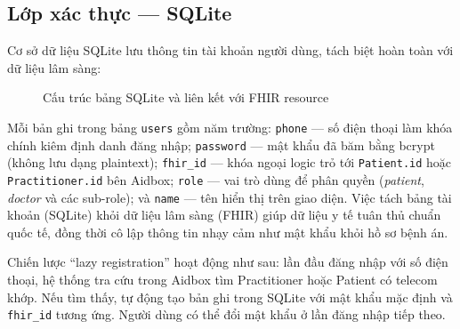 \documentclass[a4paper,13pt,3p,oneside]{report}
\theoremstyle{definition}
\theoremstyle{remark}
\theoremstyle{definition}
\begin{document}
\subsection{Lớp xác thực --- SQLite}

Cơ sở dữ liệu SQLite lưu thông tin tài khoản người dùng, tách biệt hoàn toàn với dữ liệu lâm sàng:

\begin{figure}[H]
\centering
{}
\caption{Cấu trúc bảng SQLite và liên kết với FHIR resource}
\label{fig:er-sqlite}
\end{figure}

Mỗi bản ghi trong bảng \texttt{users} gồm năm trường: \texttt{phone} --- số điện thoại làm khóa chính kiêm định danh đăng nhập; \texttt{password} --- mật khẩu đã băm bằng bcrypt (không lưu dạng plaintext); \texttt{fhir\_id} --- khóa ngoại logic trỏ tới \texttt{Patient.id} hoặc \texttt{Practitioner.id} bên Aidbox; \texttt{role} --- vai trò dùng để phân quyền (\textit{patient}, \textit{doctor} và các sub-role); và \texttt{name} --- tên hiển thị trên giao diện. Việc tách bảng tài khoản (SQLite) khỏi dữ liệu lâm sàng (FHIR) giúp dữ liệu y tế tuân thủ chuẩn quốc tế, đồng thời cô lập thông tin nhạy cảm như mật khẩu khỏi hồ sơ bệnh án.

Chiến lược ``lazy registration'' hoạt động như sau: lần đầu đăng nhập với số điện thoại, hệ thống tra cứu trong Aidbox tìm Practitioner hoặc Patient có telecom khớp. Nếu tìm thấy, tự động tạo bản ghi trong SQLite với mật khẩu mặc định và \texttt{fhir\_id} tương ứng. Người dùng có thể đổi mật khẩu ở lần đăng nhập tiếp theo.
\end{document}
